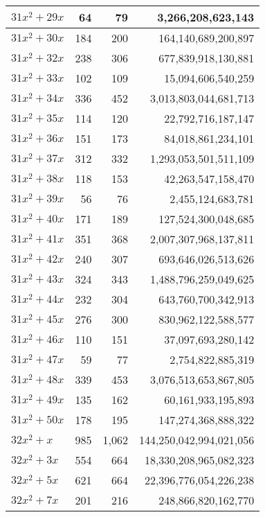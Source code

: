 \documentclass[a4paper]{amsproc}
\theoremstyle{plain}
\begin{document}
\begin{longtable}{ | l | r | r | r | }
$31x^2 + 29x$ & 64 & 79 & 3{,}266{,}208{,}623{,}143 \\ \hline
$31x^2 + 30x$ & 184 & 200 & 164{,}140{,}689{,}200{,}897 \\ \hline
$31x^2 + 32x$ & 238 & 306 & 677{,}839{,}918{,}130{,}881 \\ \hline
$31x^2 + 33x$ & 102 & 109 & 15{,}094{,}606{,}540{,}259 \\ \hline
$31x^2 + 34x$ & 336 & 452 & 3{,}013{,}803{,}044{,}681{,}713 \\ \hline
$31x^2 + 35x$ & 114 & 120 & 22{,}792{,}716{,}187{,}147 \\ \hline
$31x^2 + 36x$ & 151 & 173 & 84{,}018{,}861{,}234{,}101 \\ \hline
$31x^2 + 37x$ & 312 & 332 & 1{,}293{,}053{,}501{,}511{,}109 \\ \hline
$31x^2 + 38x$ & 118 & 153 & 42{,}263{,}547{,}158{,}470 \\ \hline
$31x^2 + 39x$ & 56 & 76 & 2{,}455{,}124{,}683{,}781 \\ \hline
$31x^2 + 40x$ & 171 & 189 & 127{,}524{,}300{,}048{,}685 \\ \hline
$31x^2 + 41x$ & 351 & 368 & 2{,}007{,}307{,}968{,}137{,}811 \\ \hline
$31x^2 + 42x$ & 240 & 307 & 693{,}646{,}026{,}513{,}626 \\ \hline
$31x^2 + 43x$ & 324 & 343 & 1{,}488{,}796{,}259{,}049{,}625 \\ \hline
$31x^2 + 44x$ & 232 & 304 & 643{,}760{,}700{,}342{,}913 \\ \hline
$31x^2 + 45x$ & 276 & 300 & 830{,}962{,}122{,}588{,}577 \\ \hline
$31x^2 + 46x$ & 110 & 151 & 37{,}097{,}693{,}280{,}142 \\ \hline
$31x^2 + 47x$ & 59 & 77 & 2{,}754{,}822{,}885{,}319 \\ \hline
$31x^2 + 48x$ & 339 & 453 & 3{,}076{,}513{,}653{,}867{,}805 \\ \hline
$31x^2 + 49x$ & 135 & 162 & 60{,}161{,}933{,}195{,}893 \\ \hline
$31x^2 + 50x$ & 178 & 195 & 147{,}274{,}368{,}888{,}322 \\ \hline
$32x^2 + x$ & 985 & 1{,}062 & 144{,}250{,}042{,}994{,}021{,}056 \\ \hline
$32x^2 + 3x$ & 554 & 664 & 18{,}330{,}208{,}965{,}082{,}323 \\ \hline
$32x^2 + 5x$ & 621 & 664 & 22{,}396{,}776{,}054{,}226{,}238 \\ \hline
$32x^2 + 7x$ & 201 & 216 & 248{,}866{,}820{,}162{,}770 \\ \hline

\end{longtable}
\end{document}
